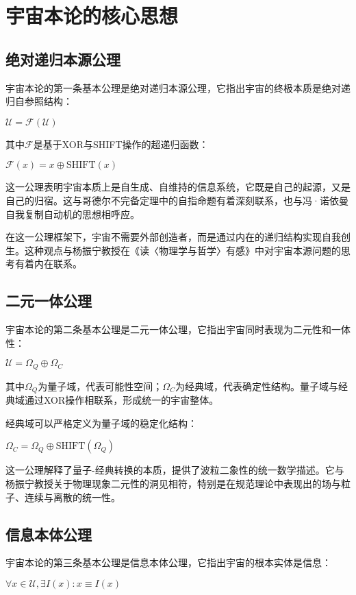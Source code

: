 \chapter{宇宙本论的核心思想}

\section{绝对递归本源公理}

宇宙本论的第一条基本公理是绝对递归本源公理，它指出宇宙的终极本质是绝对递归自参照结构：

$\mathcal{U} = \mathcal{F}(\mathcal{U})$

其中$\mathcal{F}$是基于XOR与SHIFT操作的超递归函数：

$\mathcal{F}(x) = x \oplus \text{SHIFT}(x)$

这一公理表明宇宙本质上是自生成、自维持的信息系统，它既是自己的起源，又是自己的归宿。这与哥德尔不完备定理中的自指命题有着深刻联系，也与冯·诺依曼自我复制自动机的思想相呼应。

在这一公理框架下，宇宙不需要外部创造者，而是通过内在的递归结构实现自我创生。这种观点与杨振宁教授在《读〈物理学与哲学〉有感》中对宇宙本源问题的思考有着内在联系。

\section{二元一体公理}

宇宙本论的第二条基本公理是二元一体公理，它指出宇宙同时表现为二元性和一体性：

$\mathcal{U} = \Omega_Q \oplus \Omega_C$

其中$\Omega_Q$为量子域，代表可能性空间；$\Omega_C$为经典域，代表确定性结构。量子域与经典域通过XOR操作相联系，形成统一的宇宙整体。

经典域可以严格定义为量子域的稳定化结构：

$\Omega_C = \Omega_Q \oplus \text{SHIFT}(\Omega_Q)$

这一公理解释了量子-经典转换的本质，提供了波粒二象性的统一数学描述。它与杨振宁教授关于物理现象二元性的洞见相符，特别是在规范理论中表现出的场与粒子、连续与离散的统一性。

\section{信息本体公理}

宇宙本论的第三条基本公理是信息本体公理，它指出宇宙的根本实体是信息：

$\forall x \in \mathcal{U}, \exists I(x) : x \equiv I(x)$

